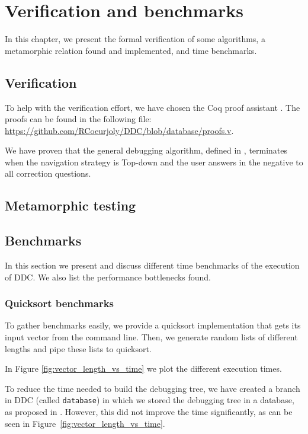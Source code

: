 \chapter{Verification and benchmarks}
\label{cap:verificationAndTesting}
In this chapter, we present the formal verification of some algorithms, a metamorphic relation found and implemented, and time benchmarks.
\section{Verification}
To help with the verification effort, we have chosen the Coq proof assistant \cite{coq}. The proofs can be found in the following file:  \url{https://github.com/RCoeurjoly/DDC/blob/database/proofs.v}.

We have proven that the general debugging algorithm, defined in \cite{optimal_strategy}, terminates when the navigation strategy is Top-down and the user answers in the negative to all correction questions.
\section{Metamorphic testing}
\section{Benchmarks}
In this section we present and discuss different time benchmarks of the execution of DDC. We also list the performance bottlenecks found.

\subsection{Quicksort benchmarks}
To gather benchmarks easily, we provide a quicksort implementation that gets its input vector from the command line.
Then, we generate random lists of different lengths and pipe these lists to quicksort.

In Figure \ref{fig:vector_length_vs_time} we plot the different execution times.

To reduce the time needed to build the debugging tree, we have created a branch in DDC (called \verb|database|) in which we stored the debugging tree in a database, as proposed in \cite{DDJ}.
However, this did not improve the time significantly, as can be seen in Figure~\ref{fig:vector_length_vs_time}.

